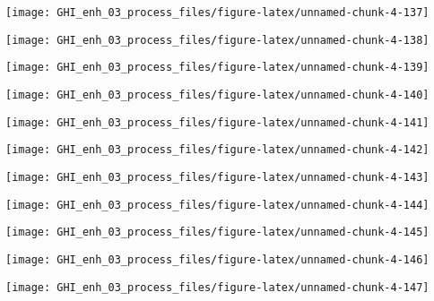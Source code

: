 \documentclass[
  10pt,
  a4paper,oneside]{article}
\begin{document}
\begin{center}\texttt{[image: GHI\_enh\_03\_process\_files/figure-latex/unnamed-chunk-4-137]} \end{center}

\begin{center}\texttt{[image: GHI\_enh\_03\_process\_files/figure-latex/unnamed-chunk-4-138]} \end{center}

\begin{center}\texttt{[image: GHI\_enh\_03\_process\_files/figure-latex/unnamed-chunk-4-139]} \end{center}

\begin{center}\texttt{[image: GHI\_enh\_03\_process\_files/figure-latex/unnamed-chunk-4-140]} \end{center}

\begin{center}\texttt{[image: GHI\_enh\_03\_process\_files/figure-latex/unnamed-chunk-4-141]} \end{center}

\begin{center}\texttt{[image: GHI\_enh\_03\_process\_files/figure-latex/unnamed-chunk-4-142]} \end{center}

\begin{center}\texttt{[image: GHI\_enh\_03\_process\_files/figure-latex/unnamed-chunk-4-143]} \end{center}

\begin{center}\texttt{[image: GHI\_enh\_03\_process\_files/figure-latex/unnamed-chunk-4-144]} \end{center}

\begin{center}\texttt{[image: GHI\_enh\_03\_process\_files/figure-latex/unnamed-chunk-4-145]} \end{center}

\begin{center}\texttt{[image: GHI\_enh\_03\_process\_files/figure-latex/unnamed-chunk-4-146]} \end{center}

\begin{center}\texttt{[image: GHI\_enh\_03\_process\_files/figure-latex/unnamed-chunk-4-147]} \end{center}
\end{document}
